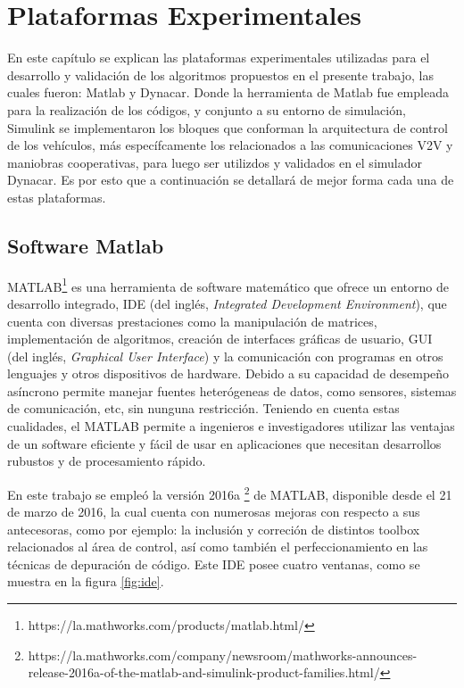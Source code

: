 \chapter{Plataformas Experimentales}\label{sec:capitulo4}
\thispagestyle{empty}
En este capítulo se explican las plataformas experimentales utilizadas para el desarrollo y validación de los algoritmos propuestos en el presente trabajo, las cuales fueron: Matlab y Dynacar. Donde la herramienta de Matlab fue empleada para la realización de los códigos,  y conjunto a su entorno de simulación, Simulink se implementaron los bloques que conforman la arquitectura de control de los vehículos, más específcamente los relacionados a las comunicaciones V2V y maniobras cooperativas, para luego ser utilizdos y validados en el simulador Dynacar. Es por esto que a continuación se detallará de mejor forma cada una de estas plataformas.\\
\section{Software Matlab}
MATLAB\footnote{https://la.mathworks.com/products/matlab.html/} es una herramienta de software matemático que ofrece un entorno de desarrollo integrado, IDE (del inglés, \textit{Integrated Development Environment}), que cuenta con diversas prestaciones como la manipulación de matrices, implementación de algoritmos, creación de interfaces gráficas de usuario, GUI (del inglés, \textit{Graphical User Interface}) y la comunicación con programas en otros lenguajes y otros dispositivos de hardware. Debido a su capacidad de desempeño asíncrono permite manejar fuentes heterógeneas de datos, como sensores, sistemas de comunicación, etc, sin nunguna restricción. Teniendo en cuenta estas cualidades, el MATLAB permite a ingenieros e investigadores utilizar las ventajas de un software eficiente y fácil de usar en aplicaciones que necesitan desarrollos rubustos y de procesamiento rápido.\\
\par En este trabajo se empleó la versión 2016a \footnote{https://la.mathworks.com/company/newsroom/mathworks-announces-release-2016a-of-the-matlab-and-simulink-product-families.html/} de MATLAB, disponible desde el 21 de marzo de 2016, la cual cuenta con numerosas mejoras con respecto a sus antecesoras, como por ejemplo: la inclusión y correción de distintos toolbox relacionados al área de control, así como también el perfeccionamiento en las técnicas de depuración de código. Este IDE posee cuatro ventanas, como se muestra en la figura \ref{fig:ide}.\\

